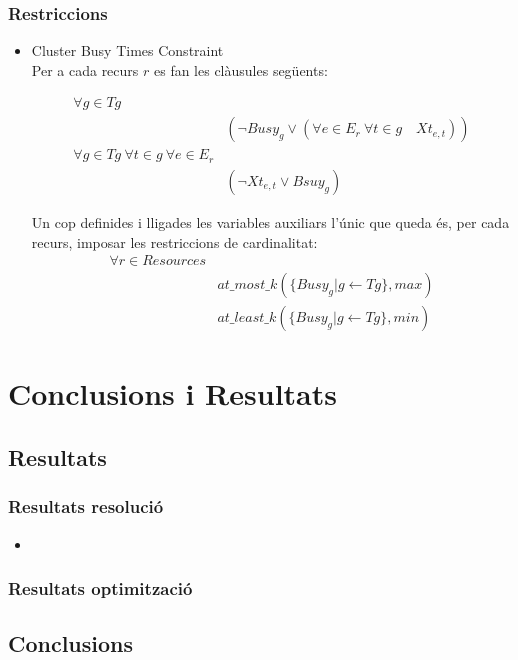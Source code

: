 \documentclass[8pt]{beamer}
\begin{document}
  \begin{frame}
    \frametitle{Restriccions}

    \begin{itemize}
    
      \item Cluster Busy Times Constraint \\
      Per a cada recurs $r$ es fan les clàusules següents:
      
      \begin{align*}
        \forall g \in Tg & \\
        &(\neg Busy_g \lor (\forall e \in E_r \ \forall t \in g \quad Xt_{e,t}))\\
        \forall g \in Tg \ \forall t \in g \ \forall e \in E_r &\\
        & (\neg Xt_{e,t} \lor Bsuy_g)
      \end{align*}
    
      Un cop definides i lligades les variables auxiliars l'únic que queda és, per cada recurs, imposar les restriccions de cardinalitat:
      \begin{align*}
        \forall r \in Resources &\\
        & at\_most\_k(\{ Busy_g | g \leftarrow Tg\}, max) \\
        & at\_least\_k(\{ Busy_g | g \leftarrow Tg\}, min)
       \end{align*}
          
    \end{itemize}
  
  \end{frame}


  \section{Conclusions i Resultats}
  \subsection{Resultats}
  
  \begin{frame}
    \frametitle{Resultats resolució}
    \begin{itemize}
      \item 
    \end{itemize}

  \end{frame}

  \begin{frame}
    \frametitle{Resultats optimització}
  \end{frame}

  \subsection{Conclusions}

  
  \begin{frame}
  \end{frame}




  
\end{document}
